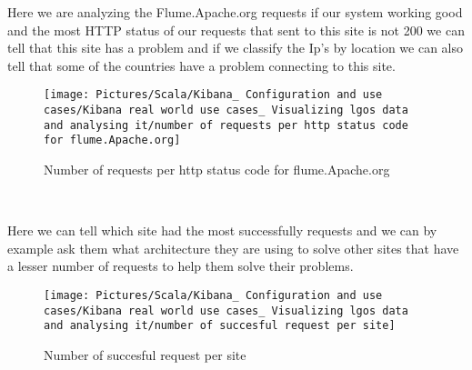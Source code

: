 \begin{spacing}{1.2}
\par Here we are analyzing the Flume.Apache.org requests if our system working good and the most HTTP status of our requests that sent to this site is not 200 we can tell that this site has a problem and if we classify the Ip's by location we can also tell that some of the countries have a problem connecting to this site. 
\\

\begin{figure}[!htb] 
\begin{center} 
\texttt{[image: Pictures/Scala/Kibana\_ Configuration and use cases/Kibana real world use cases\_ Visualizing lgos data and analysing it/number of requests per http status code for flume.Apache.org]} 
\end{center} 
\caption{Number of requests per http status code for flume.Apache.org} 
\end{figure}  \FloatBarrier
\\


\par Here we can tell which site had the most successfully requests and we can by example ask them what architecture they are using to solve other sites that have a lesser number of requests to help them solve their problems.
\\
\begin{figure}[!htb] 
\begin{center} 
\texttt{[image: Pictures/Scala/Kibana\_ Configuration and use cases/Kibana real world use cases\_ Visualizing lgos data and analysing it/number of succesful request per site]} 
\end{center} 
\caption{Number of succesful request per site} 
\end{figure}  \FloatBarrier
\\

\end{spacing}

